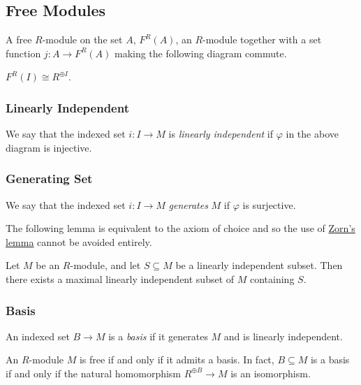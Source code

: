 \subsection{Free Modules}\label{freemodules}
A free $R$-module on the set $A$, $F^R(A)$, an $R$-module together with a set
function $j : A \rightarrow F^R(A)$ making the following diagram commute.
\begin{figure}[H]
\centering

\end{figure}

\begin{proposition}
$F^R(I) \cong R^{\oplus I}$.
\end{proposition}

\subsubsection{Linearly Independent}\label{linearlyindependent}
We say that the indexed set $i : I \rightarrow M$ is \emph{linearly independent} if $\varphi$ in
the above diagram is injective.

\subsubsection{Generating Set}\label{generatingset}
We say that the indexed set $i : I \rightarrow M$ \emph{generates} $M$ if $\varphi$ is surjective.\newline

\noindent The following lemma is equivalent to the axiom of choice and so the use of \hyperref[zornslemma]{Zorn's lemma}
cannot be avoided entirely.

\begin{lemma}
\label{maximallinearlyindependentset}
Let $M$ be an $R$-module, and let $S \subseteq M$ be a linearly independent subset. Then there exists a
maximal linearly independent subset of $M$ containing $S$.
\end{lemma}

\subsubsection{Basis}\label{basis}
An indexed set $B \rightarrow M$ is a \emph{basis} if it generates $M$ and is linearly independent.

\begin{lemma}
\label{basisisfree}
An $R$-module $M$ is free if and only if it admits a basis. In fact, $B \subseteq M$ is a basis
if and only if the natural homomorphism $R^{\oplus B} \rightarrow M$ is an isomorphism.
\end{lemma}

